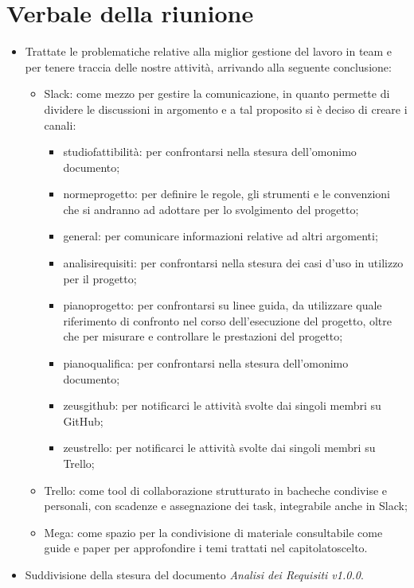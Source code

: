 \section{Verbale della riunione}
\begin{itemize}
	\item Trattate le problematiche relative alla miglior gestione del lavoro in team e per tenere traccia delle nostre attività, arrivando alla seguente conclusione:
	\begin{itemize}
		\item Slack\glo: come mezzo per gestire la comunicazione, in quanto permette di dividere le discussioni in argomento e a tal proposito si è deciso di creare i canali:
		\begin{itemize}
			\item studiofattibilità: per confrontarsi nella stesura dell'omonimo documento;
			\item normeprogetto: per definire le regole, gli strumenti e le convenzioni che si andranno ad adottare per lo svolgimento del progetto;
			\item general: per comunicare informazioni relative ad altri argomenti;
			\item analisirequisiti: per confrontarsi nella stesura dei casi d'uso in utilizzo per il progetto;
			\item pianoprogetto: per confrontarsi su linee guida, da utilizzare quale riferimento di confronto nel corso dell’esecuzione del progetto, oltre che per misurare e controllare le prestazioni del progetto;
			\item pianoqualifica: per confrontarsi nella stesura dell'omonimo documento;
			\item zeusgithub: per notificarci le attività svolte dai singoli membri su GitHub\glo;
			\item zeustrello: per notificarci le attività svolte dai singoli membri su Trello\glo;
		\end{itemize}  
		\item Trello: come tool di collaborazione strutturato in bacheche condivise e personali, con scadenze e assegnazione dei task, integrabile anche in Slack;
		\item Mega: come spazio per la condivisione di materiale consultabile come guide e paper per approfondire i temi trattati nel capitolato\glosp scelto.
	\end{itemize}
	\item Suddivisione della stesura del documento \textit{Analisi dei Requisiti v1.0.0}. 
\end{itemize} 
\pagebreak
